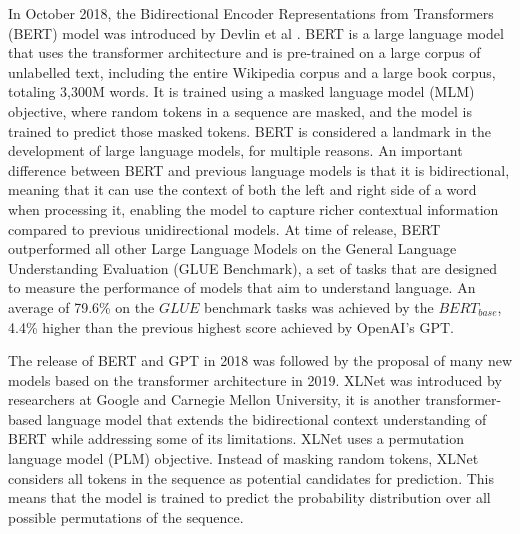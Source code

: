 \documentclass{UoYCSproject}
\begin{document}
    In October 2018, the Bidirectional Encoder Representations from Transformers (BERT) model was introduced by Devlin et al \cite{devlin2019bert} .
    BERT is a large language model that uses the transformer architecture and is pre-trained on a large corpus of unlabelled text, including the entire Wikipedia corpus and a large book corpus, totaling 3,300M words.
    It is trained using a masked language model (MLM) objective, where random tokens in a sequence are masked, and the model is trained to predict those masked tokens.
    BERT is considered a landmark in the development of large language models, for multiple reasons.
    An important difference between BERT and previous language models is that it is bidirectional, meaning that it can
    use the context of both the left and right side of a word when processing it, enabling the model to capture richer contextual information compared to previous unidirectional models.
    At time of release, BERT outperformed all other Large Language Models on the General Language Understanding Evaluation (GLUE Benchmark), a set of tasks that are designed to measure the performance of models that aim to understand language.
    An average of 79.6\% on the $GLUE$ benchmark tasks was achieved by the $BERT_{base}$, 4.4\% higher than the previous highest score achieved by OpenAI's GPT.

    The release of BERT and GPT in 2018 was followed by the proposal of many new models based on the transformer architecture in 2019.
    XLNet was introduced by researchers at Google and Carnegie Mellon University, it is another transformer-based language model that extends the bidirectional context understanding of BERT while addressing some of its limitations.
    XLNet uses a permutation language model (PLM) objective.
    Instead of masking random tokens, XLNet considers all tokens in the sequence as potential candidates for prediction.
    This means that the model is trained to predict the probability distribution over all possible permutations of the sequence.
\end{document}
